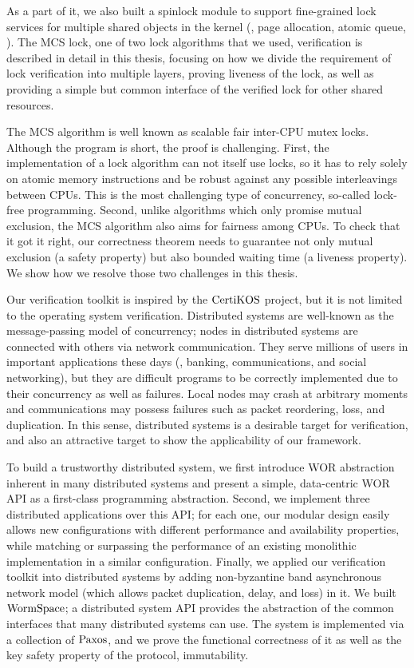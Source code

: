 As a part of it, 
we also built a spinlock module to support fine-grained lock services for multiple shared objects in the kernel 
(\ie, page allocation, atomic queue, \etc).
The MCS lock, one of two lock algorithms that we used, verification
is described in detail in this thesis, 
focusing on how we divide the requirement of 
lock verification into multiple layers, proving liveness of the lock, as well as
providing a simple but common interface of the verified lock for other shared resources. 

The MCS algorithm is well known as scalable fair inter-CPU mutex locks.
Although the program is short, the proof is challenging.
First, the implementation of a lock algorithm can not itself use locks, so it has to rely solely on atomic memory instructions and be robust against any possible interleavings between CPUs. This is the most challenging type of concurrency, so-called lock-free programming.
Second, unlike algorithms which only promise mutual exclusion, the MCS algorithm also aims for fairness among CPUs. To check that it got it right, our correctness theorem needs to guarantee not only mutual exclusion (a safety property) but also bounded waiting time (a liveness property).
We show how we resolve those two challenges in this thesis.

Our verification toolkit is inspired by the $\mathrm{CertiKOS}$ project,
but it is not limited to the operating system verification. 
Distributed systems are well-known as the message-passing model of concurrency;
nodes in distributed systems are connected with others via network communication.
They serve millions of users in important applications these days (\ie, banking, communications, and social networking), 
but they are difficult programs to be correctly implemented due to their concurrency as well as failures.
Local nodes may crash at arbitrary moments and communications may possess failures such as packet reordering, loss, and duplication. 
In this sense, distributed systems is a desirable target for verification, and also an attractive target to show the applicability of our framework. 

To build a trustworthy distributed system,
we first introduce WOR abstraction inherent in many distributed systems and present a simple, data-centric WOR API as a first-class programming abstraction. Second, we implement three distributed applications over this API; for each one, our modular design easily allows new configurations with different performance and availability properties, while matching or surpassing the performance of an existing monolithic implementation in a similar configuration. 
Finally, we applied our verification toolkit into distributed systems by adding non-byzantine band asynchronous network model (which allows packet duplication, delay, and loss)  in it.
We built  $\mathrm{WormSpace}$; a distributed system API provides the abstraction of the common interfaces that many distributed systems can use.
The system is implemented via a collection of $\mathrm{Paxos}$,
and we prove the functional correctness of it as well as the key safety property of the protocol, immutability. 


